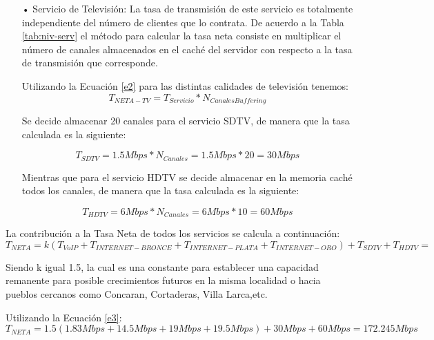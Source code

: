 \begin{itemize}
\item[•] Servicio de Televisión: La tasa de transmisión de este servicio es totalmente independiente del número de clientes que lo contrata. De acuerdo a la Tabla \ref{tab:niv-serv} el método para calcular la tasa neta consiste en multiplicar el número de canales almacenados en el caché del servidor con respecto a  la tasa de transmisión que corresponde.

Utilizando la Ecuación \ref{e2} para las distintas calidades de televisión tenemos:
\begin{equation}
T_{NETA-TV}=T_{Servicio}*N_{Canales Buffering}
\label{e2}
\end{equation}

Se decide almacenar 20 canales para el servicio SDTV, de manera que la tasa calculada es la siguiente:



\begin{equation}
T_{SDTV}=1.5Mbps*N_{Canales} =1.5Mbps * 20 =30Mbps
\end{equation}




Mientras que para el servicio HDTV se decide almacenar en la memoria caché todos los canales, de manera que la tasa calculada es la siguiente:





\begin{equation}
T_{HDTV}=6Mbps*N_{Canales}=6Mbps * 10 =60Mbps
\end{equation}

\end{itemize}

La contribución a la Tasa Neta de todos los servicios se calcula a continuación:
\begin{equation}
T_{NETA}=k(T_{VoIP}+T_{INTERNET-BRONCE}+T_{INTERNET-PLATA}+T_{INTERNET-ORO})+T_{SDTV}+T_{HDTV}=
\label{e3}
\end{equation}

Siendo k igual 1.5, la cual es una constante para establecer una capacidad remanente para posible crecimientos futuros en la misma localidad o hacia pueblos cercanos como Concaran, Cortaderas, Villa Larca,etc.


Utilizando la Ecuación \ref{e3}:
\begin{equation}
T_{NETA}=1.5(1.83 Mbps +  14.5Mbps + 19Mbps + 19.5Mbps)+30Mbps+60Mbps=172.245 Mbps
\end{equation}





